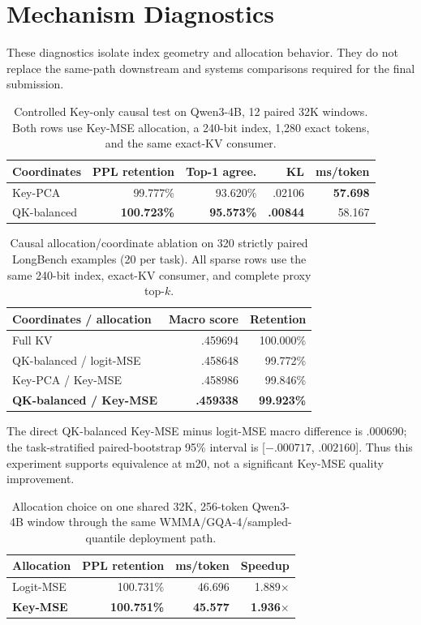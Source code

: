 \section{Mechanism Diagnostics}
\label{app:mechanism-results}

These diagnostics isolate index geometry and allocation behavior.  They do
not replace the same-path downstream and systems comparisons required for
the final submission.

\begin{table}[H]
\caption{Controlled Key-only causal test on Qwen3-4B, 12 paired 32K
windows.  Both rows use Key-MSE allocation, a 240-bit index, 1,280 exact
tokens, and the same exact-KV consumer.}
\label{tab:key-only-causal}
\centering
\begin{tabular}{lrrrr}
\toprule
Coordinates & PPL retention & Top-1 agree. & KL & ms/token \\
\midrule
Key-PCA & 99.777\% & 93.620\% & .02106 & \textbf{57.698} \\
QK-balanced & \textbf{100.723\%} & \textbf{95.573\%} &
\textbf{.00844} & 58.167 \\
\bottomrule
\end{tabular}
\end{table}

\begin{table}[H]
\caption{Causal allocation/coordinate ablation on 320 strictly paired
LongBench examples (20 per task).  All sparse rows use the same 240-bit
index, exact-KV consumer, and complete proxy top-$k$.}
\label{tab:allocation-causal}
\centering
\begin{tabular}{lrr}
\toprule
Coordinates / allocation & Macro score & Retention \\
\midrule
Full KV & .459694 & 100.000\% \\
QK-balanced / logit-MSE & .458648 & 99.772\% \\
Key-PCA / Key-MSE & .458986 & 99.846\% \\
\textbf{QK-balanced / Key-MSE} & \textbf{.459338} & \textbf{99.923\%} \\
\bottomrule
\end{tabular}
\end{table}

The direct QK-balanced Key-MSE minus logit-MSE macro difference is .000690;
the task-stratified paired-bootstrap 95\% interval is
[$-.000717$, $.002160$].  Thus this experiment supports equivalence at m20,
not a significant Key-MSE quality improvement.

\begin{table}[H]
\caption{Allocation choice on one shared 32K, 256-token Qwen3-4B window
through the same WMMA/GQA-4/sampled-quantile deployment path.}
\label{tab:allocation-deploy}
\centering
\begin{tabular}{lrrr}
\toprule
Allocation & PPL retention & ms/token & Speedup \\
\midrule
Logit-MSE & 100.731\% & 46.696 & 1.889$\times$ \\
\textbf{Key-MSE} & \textbf{100.751\%} & \textbf{45.577} &
\textbf{1.936$\times$} \\
\bottomrule
\end{tabular}
\end{table}

